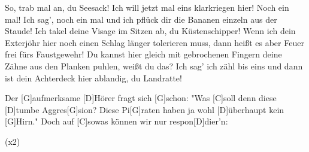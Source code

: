 \begin{guitar}
	So, trab mal an, du Seesack! Ich will jetzt mal eins klarkriegen hier! 
	Noch ein mal! Ich sag', noch ein mal und ich pflück dir die Bananen 
	einzeln aus der Staude! Ich takel deine Visage im Sitzen ab, du 
	Küstenschipper! Wenn ich dein Exterjöhr hier noch einen Schlag 
	länger tolerieren muss, dann heißt es aber Feuer frei fürs Faustgewehr! 
	Du kannst hier gleich mit gebrochenen Fingern deine Zähne aus den 
	Planken puhlen, weißt du das? Ich sag' ich zähl bis eins und dann
	ist dein Achterdeck hier ablandig, du Landratte!
	
	Der [G]aufmerksame [D]Hörer fragt sich [G]schon:
	"Was [C]soll denn diese [D]tumbe Aggres[G]sion?
	Diese Pi[G]raten haben ja wohl [D]{ü}berhaupt kein [G]Hirn."
	Doch auf [C]sowas können wir nur respon[D]dier'n:
	
	  (x2)
	
\end{guitar}